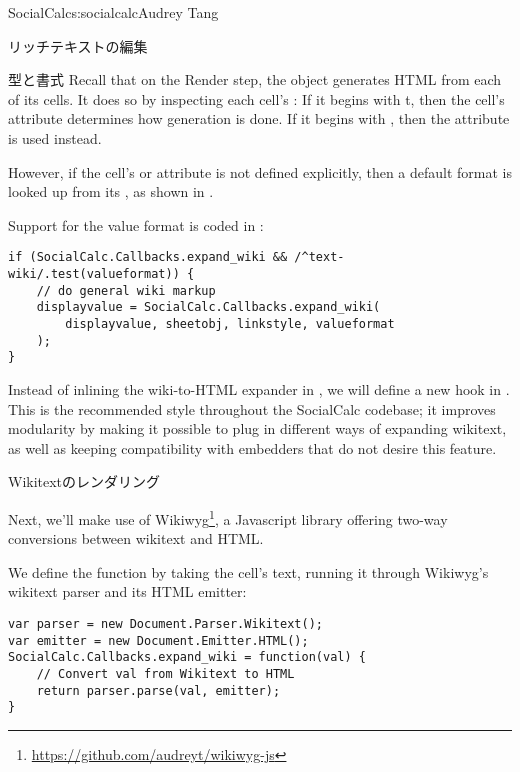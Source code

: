\begin{aosachapter}{SocialCalc}{s:socialcalc}{Audrey Tang}
\begin{aosasect1}{リッチテキストの編集}
\begin{aosasect2}{型と書式}
Recall that on the Render step, the  object generates HTML
from each of its cells.  It does so by inspecting each cell's
: If it begins with t, then the cell's
 attribute determines how generation is done.
If it begins with , then the  attribute is
used instead.

However, if the cell's  or
 attribute is not defined explicitly, then a
default format is looked up from its , as shown in
.



\noindent Support for the  value format is coded in
:

\begin{verbatim}
if (SocialCalc.Callbacks.expand_wiki && /^text-wiki/.test(valueformat)) {
    // do general wiki markup
    displayvalue = SocialCalc.Callbacks.expand_wiki(
        displayvalue, sheetobj, linkstyle, valueformat
    );
}
\end{verbatim}

Instead of inlining the wiki-to-HTML expander in
, we will define a new hook in
.  This is the recommended style
throughout the SocialCalc codebase; it improves modularity by making
it possible to plug in different ways of expanding wikitext, as well
as keeping compatibility with embedders that do not desire this
feature.

\end{aosasect2}

\begin{aosasect2}{Wikitextのレンダリング}

Next, we'll make use of
Wikiwyg\footnote{\url{https://github.com/audreyt/wikiwyg-js}}, a
Javascript library offering two-way conversions between wikitext and
HTML.

We define the  function by taking the cell's text,
running it through Wikiwyg's wikitext parser and its HTML emitter:

\begin{verbatim}
var parser = new Document.Parser.Wikitext();
var emitter = new Document.Emitter.HTML();
SocialCalc.Callbacks.expand_wiki = function(val) {
    // Convert val from Wikitext to HTML
    return parser.parse(val, emitter);
}
\end{verbatim}


\end{aosasect2}
\end{aosasect1}
\end{aosachapter}
